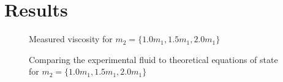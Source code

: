 \chapter{Results}

\begin{figure}[htbp]
    \begin{center}
        
        \caption{
            Measured viscosity for $m_2 = 
            \{1.0m_1, 1.5m_1, 2.0m_1\}$
        }
    \end{center}
\end{figure}

\begin{figure}[htbp]
    \begin{center}
        
    \end{center}
        \caption{
            Comparing the experimental fluid to theoretical equations 
            of state for $m_2 = \{1.0m_1, 1.5m_1, 2.0m_1\}$
        }
\end{figure}
